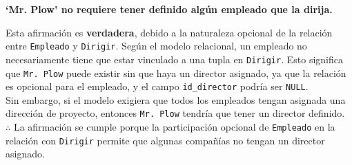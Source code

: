 \textbf{‘Mr. Plow’ no requiere tener definido algún empleado que la dirija.}\vspace{.3cm}

Esta afirmación es \textbf{verdadera}, debido a la naturaleza opcional de la relación entre \texttt{Empleado} y \texttt{Dirigir}. Según el modelo relacional, un empleado no necesariamente tiene que estar vinculado a una tupla en \texttt{Dirigir}. Esto significa que \texttt{Mr. Plow} puede existir sin que haya un director asignado, ya que la relación es opcional para el empleado, y el campo \texttt{id\_director} podría ser \texttt{NULL}. \\

Sin embargo, si el modelo exigiera que todos los empleados tengan asignada una dirección de proyecto, entonces \texttt{Mr. Plow} tendría que tener un director definido. \\

$\therefore$ La afirmación se cumple porque la participación opcional de \texttt{Empleado} en la relación con \texttt{Dirigir} permite que algunas compañías no tengan un director asignado.